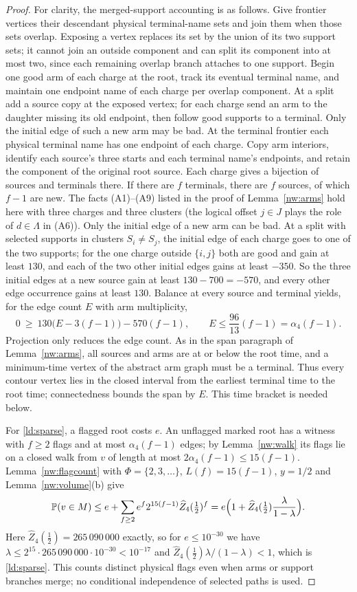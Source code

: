 \begin{proof}
For clarity, the merged-support accounting is as follows. Give frontier vertices their descendant physical terminal-name sets and join them when those sets overlap. Exposing a vertex replaces its set by the union of its two support sets; it cannot join an outside component and can split its component into at most two, since each remaining overlap branch attaches to one support. Begin one good arm of each charge at the root, track its eventual terminal name, and maintain one endpoint name of each charge per overlap component. At a split add a source copy at the exposed vertex; for each charge send an arm to the daughter missing its old endpoint, then follow good supports to a terminal. Only the initial edge of such a new arm may be bad. At the terminal frontier each physical terminal name has one endpoint of each charge. Copy arm interiors, identify each source's three starts and each terminal name's endpoints, and retain the component of the original root source. Each charge gives a bijection of sources and terminals there. If there are $f$ terminals, there are $f$ sources, of which $f-1$ are new. The facts (A1)--(A9) listed in the proof of Lemma~\ref{nw:arms} hold here with three charges and three
clusters (the logical offset $j\in J$ plays the role of $d\in\Lambda$ in (A6)). Only the initial
edge of a new arm can be bad. At a split with selected supports in clusters
$S_i\ne S_j$, the initial edge of each charge goes to one of the two supports; for the one charge
outside $\{i,j\}$ both are good and gain at least $130$, and each of the two other initial edges
gains at least $-350$. So the three initial edges at a new source gain at least $130-700=-570$, and
every other edge occurrence gains at least $130$. Balance at every source and terminal yields, for
the edge count $E$ with arm multiplicity,
\[
  0\ \ge\ 130\bigl(E-3(f-1)\bigr)-570(f-1),\qquad
  E\le\frac{96}{13}(f-1)=\alpha_4(f-1).
\]
Projection only reduces the edge count. As in the span paragraph of Lemma~\ref{nw:arms}, all sources
and arms are at or below the root time, and a minimum-time vertex of the abstract arm graph must be a
terminal. Thus every contour vertex lies in the closed interval from the earliest terminal time to
the root time; connectedness bounds the span by $E$. This time bracket is needed below.

For \eqref{ld:sparse}, a flagged root costs $e$. An unflagged marked root has a witness with
$f\ge2$ flags and at most $\alpha_4(f-1)$ edges; by Lemma~\ref{nw:walk} its flags lie on a closed
walk from $v$ of length at most $2\alpha_4(f-1)\le15(f-1)$. Lemma~\ref{nw:flagcount} with
$\Phi=\{2,3,\dots\}$, $L(f)=15(f-1)$, $y=1/2$ and Lemma~\ref{nw:volume}(b) give
\[
  \mathbb{P}(v\in M)\le e+\sum_{f\ge2}e^f2^{15(f-1)}\widehat Z_4(\tfrac12)^f
  =e\Bigl(1+\widehat Z_4(\tfrac12)\frac{\lambda}{1-\lambda}\Bigr).
\]
Here $\widehat Z_4(\frac12)=265\,090\,000$ exactly, so for $e\le10^{-30}$ we have
$\lambda\le2^{15}\cdot265\,090\,000\cdot10^{-30}<10^{-17}$ and
$\widehat Z_4(\frac12)\lambda/(1-\lambda)<1$, which is \eqref{ld:sparse}. This counts distinct
physical flags even when arms or support branches merge; no conditional independence of selected
paths is used.

\end{proof}

